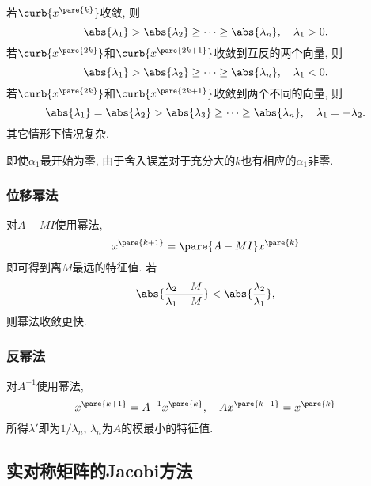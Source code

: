 \documentclass[hidelinks]{ctexart}
\begin{document}
\par
若$\curb{x^{\pare{k}}}$收敛, 则
\[ \abs{\lambda_1} > \abs{\lambda_2} \ge \cdots \ge \abs{\lambda_n},\quad \lambda_1 > 0. \]
若$\curb{x^{\pare{2k}}}$和$\curb{x^{\pare{2k+1}}}$收敛到互反的两个向量, 则
\[ \abs{\lambda_1} > \abs{\lambda_2} \ge \cdots \ge \abs{\lambda_n},\quad \lambda_1 < 0. \]
若$\curb{x^{\pare{2k}}}$和$\curb{x^{\pare{2k+1}}}$收敛到两个不同的向量, 则
\[ \abs{\lambda_1} = \abs{\lambda_2} > \abs{\lambda_3} \ge \cdots \ge \abs{\lambda_n},\quad \lambda_1 = -\lambda_2. \]
其它情形下情况复杂.
\begin{remark}
    即使$\alpha_1$最开始为零, 由于舍入误差对于充分大的$k$也有相应的$\alpha_1$非零.
\end{remark}


\subsubsection{位移幂法} %
\label{ssub:位移幂法}

对$A - MI$使用幂法,
\[ x^{\pare{k+1}} = \pare{A-MI}x^{\pare{k}} \]
即可得到离$M$最远的特征值. 若
\[ \abs{\frac{\lambda_2 - M}{\lambda_1 - M}} < \abs{\frac{\lambda_2}{\lambda_1}}, \]
则幂法收敛更快.


\subsubsection{反幂法} %
\label{ssub:反幂法}

对$A^{-1}$使用幂法,
\[ x^{\pare{k+1}} = A^{-1}x^{\pare{k}},\quad Ax^{\pare{k+1}} = x^{\pare{k}} \]
所得$\lambda'$即为$1/\lambda_n$, $\lambda_n$为$A$的模最小的特征值.



\subsection{实对称矩阵的Jacobi方法} %
\label{sub:实对称矩阵的jacobi方法}
\end{document}
